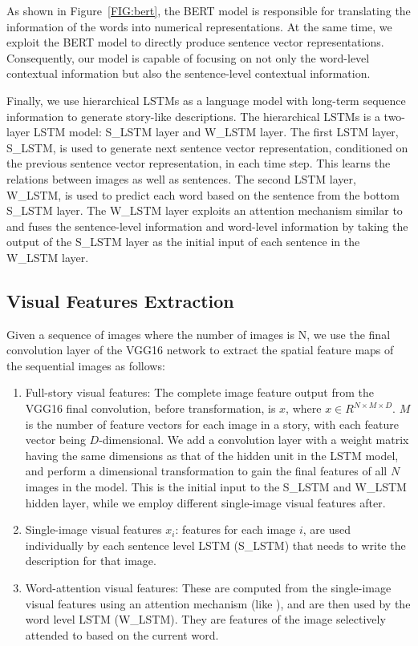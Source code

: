 \documentclass[a4paper,fleqn]{cas-sc}
\begin{document}
As shown in Figure~\ref{FIG:bert}, the BERT model is responsible for translating the information of the words into numerical representations. At the same time, we exploit the BERT model to directly produce sentence vector representations. Consequently, our model is capable of focusing on not only the word-level contextual information but also the sentence-level contextual information.

Finally, we use hierarchical LSTMs as a language model with  long-term sequence information to generate  story-like descriptions. The hierarchical LSTMs is a two-layer LSTM model: S\_LSTM layer and W\_LSTM layer. The first LSTM layer, S\_LSTM, is used to generate next sentence vector representation, conditioned on the previous sentence vector representation, in each time step. This learns the relations between images as well as sentences. The second LSTM layer,  W\_LSTM, is used to predict each word based on the sentence from the bottom S\_LSTM layer. The W\_LSTM layer exploits an attention mechanism similar to \citet{Xu2015Show} and fuses the sentence-level information and word-level information by taking the output of the S\_LSTM layer as the initial input of each sentence in the W\_LSTM layer.

\subsection{Visual Features Extraction}
Given a sequence of images where the number of images is N, we use the final convolution layer of the VGG16 network to extract the spatial feature maps of the sequential images as follows:
\begin{enumerate}
    \item Full-story visual features: The complete image feature output from the VGG16 final convolution, before transformation, is $x$,  where $x \in R^{N \times M \times D}$. $M$ is the number of feature vectors for each image in a story, with each feature vector being $D$-dimensional.
    We add a convolution layer with a weight matrix  having the same dimensions as that of the hidden unit in the LSTM model, and perform a dimensional transformation to gain the final features of all $N$ images in the model. This is the  initial input to the S\_LSTM and W\_LSTM hidden layer, while we employ  different single-image visual features after. 
    \item Single-image visual features $x_i$: features for each image $i$, are used individually by each sentence level LSTM (S\_LSTM) that needs to write the description for that image.
    \item Word-attention visual features: These are computed from the single-image visual features using an attention mechanism (like \citet{Xu2015Show}), and are then used by the word level LSTM (W\_LSTM). They are features of the image selectively attended to based on the current word.
\end{enumerate}
\end{document}
